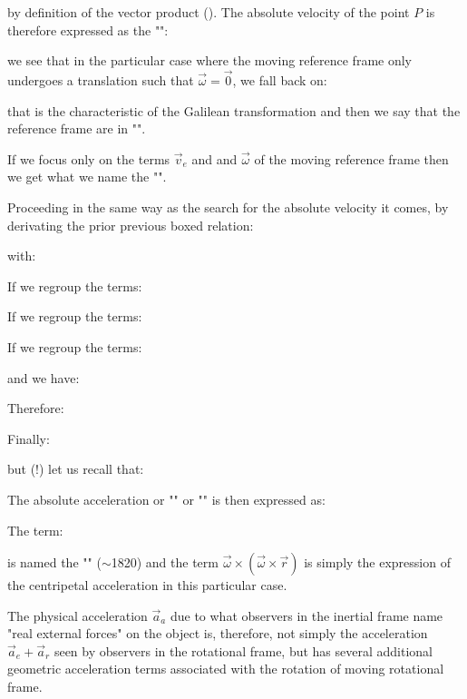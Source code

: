 	by definition of the vector product (). The absolute velocity of the point $P$ is therefore expressed as the "":
	
	we see that in the particular case where the moving reference frame only undergoes a translation such that $\vec{\omega}=\vec{0}$, we fall back on:
	
	that is the characteristic of the Galilean transformation and then we say that the reference frame are in "".
	\begin{tcolorbox}[title=Remark,colframe=black,arc=10pt]
	If we focus only on the terms $\vec{v}_e$ and and $\vec{\omega}$ of the moving reference frame then we get what we name the "".
	\end{tcolorbox}
	Proceeding in the same way as the search for the absolute velocity it comes, by derivating the prior previous boxed relation:
	
	with:
	
	If we regroup the terms:
	
	If we regroup the terms:
	
	If we regroup the terms:
	
	and we have:
	
	Therefore:
	
	Finally:
	
	but (!) let us recall that:
	
	
	The absolute acceleration or "" or "" is then expressed as:
	
	The term:
	
	is named the "" ($\sim$1820) and the term $\vec{\omega}\times(\vec{\omega}\times\vec{r})$ is simply the expression of the centripetal acceleration in this particular case.
	
	The physical acceleration $\vec{a}_a$ due to what observers in the inertial frame name "real external forces" on the object is, therefore, not simply the acceleration $\vec{a}_e+\vec{a}_r$ seen by observers in the rotational frame, but has several additional geometric acceleration terms associated with the rotation of moving rotational frame.
	
